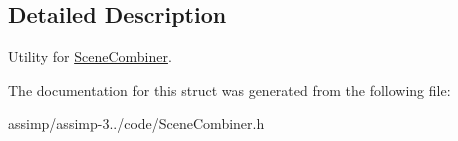 \subsection{Detailed Description}
Utility for \hyperlink{class_assimp_1_1_scene_combiner}{Scene\+Combiner}. 

The documentation for this struct was generated from the following file\+:\begin{DoxyCompactItemize}
\item 
assimp/assimp-\/3../code/Scene\+Combiner.\+h\end{DoxyCompactItemize}
